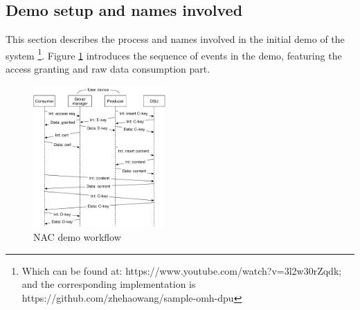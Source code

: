 \documentclass[letterpaper,twocolumn,11pt]{article}
\begin{document}
\subsection{Demo setup and names involved}

This section describes the process and names involved in the initial demo of the system \footnote{Which can be found at: https://www.youtube.com/watch?v=3l2w30rZqdk; and the corresponding implementation is https://github.com/zhehaowang/sample-omh-dpu}. Figure \ref{fig:nac} introduces the sequence of events in the demo, featuring the access granting and raw data consumption part. 

\begin{figure}[h]
\centering
\includegraphics[width=0.45\textwidth]{nac-steps.pdf}
\caption{NAC demo workflow}
\label{fig:nac}
\end{figure}
\end{document}
